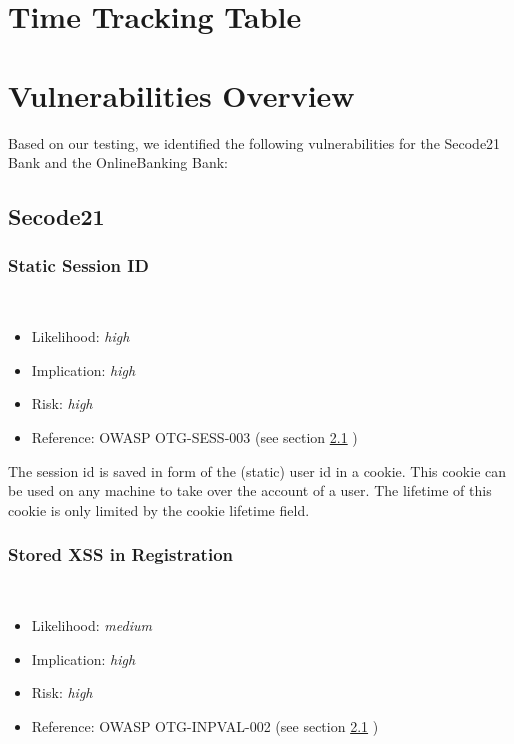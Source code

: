 \documentclass[headsepline,footsepline,footinclude=false,oneside,fontsize=11pt,paper=a4,listof=totoc,bibliography=totoc]{scrbook} %
\begin{document}


\frontmatter{}

%
%
%
%
\tableofcontents{}

\mainmatter{}

\chapter{Time Tracking Table}
%
\chapter{Vulnerabilities Overview}
Based on our testing, we identified the following vulnerabilities for the Secode21
Bank and the OnlineBanking Bank:
\section{Secode21}
\subsection{Static Session ID}\label{Static Session ID}\
\begin{itemize}
	\item Likelihood: \textit{high}
	\item Implication: \textit{high}
	\item Risk: \textit{high}
	\item Reference: OWASP OTG-SESS-003 (see section \ref{} )
\end{itemize}

The session id is saved in form of the (static) user id in a cookie. This cookie can be used on any machine
to take over the account of a user. The lifetime of this cookie is only limited by the cookie lifetime field.


\subsection{Stored XSS in Registration}\label{Stored XSS in Registration}\
\begin{itemize}
	\item Likelihood: \textit{medium}
	\item Implication: \textit{high}
	\item Risk: \textit{high}
	\item Reference: OWASP OTG-INPVAL-002 (see section \ref{} )
\end{itemize}
\end{document}
